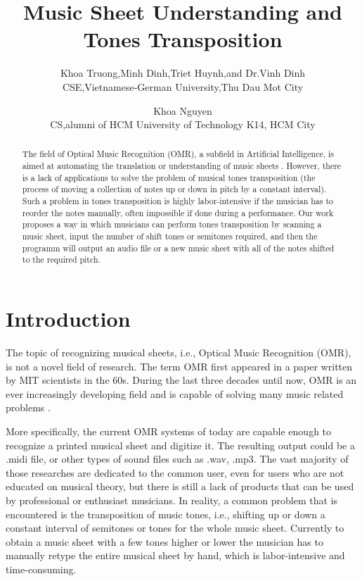 \documentclass[final]{cvpr}
\begin{document}
\title{Music Sheet Understanding and Tones Transposition}

\author{Khoa Truong,Minh Dinh,Triet Huynh,and Dr.Vinh Dinh\\
         CSE,Vietnamese-German University,Thu Dau Mot City
\and
Khoa Nguyen\\
CS,alumni of HCM University of Technology K14, HCM City
}  


\maketitle


\begin{abstract}
The field of Optical Music Recognition (OMR), a subfield in Artificial
Intelligence, is aimed at automating the translation or understanding of music
sheets \cite{Calvo-Zaragoza}.  However, there is a lack of applications to solve
the problem of musical tones transposition (the process of moving a collection
of notes up or down in pitch by a constant interval).  Such a problem in tones
transposition is highly labor-intensive if the musician has to reorder the notes
manually, often impossible if done during a performance. Our work proposes a way
in which musicians can perform tones transposition by scanning a music sheet,
input the number of shift tones or semitones required, and then the programm
will output an audio file or a new music sheet with all of the notes shifted to
the required pitch. 
\end{abstract}

\section{Introduction}
The topic of recognizing musical sheets, i.e., Optical Music Recognition (OMR),
is not a novel field of research. The term OMR first appeared in a paper written
by MIT scientists in the 60s.  During the last three decades until now, OMR is
an ever increasingly developing field and is capable of solving many music related
problems \cite{Shatri2020a}.

More specifically, the current OMR systems of today are capable enough to
recognize a printed musical sheet and digitize it. The resulting output could be
a .midi file, or other types of sound files such as .wav, .mp3. The vast
majority of those researches are dedicated to the common user, even for users
who are not educated on musical theory, but there is still a lack of products
that can be used by professional or enthusiast musicians. In reality, a common
problem that is encountered is the transposition of music tones, i.e., shifting up or down a constant interval of
semitones or tones for the whole music sheet. Currently to obtain a music
sheet with a few tones higher or lower the musician has to manually retype the
entire musical sheet by hand, which is labor-intensive and time-consuming.
\end{document}
